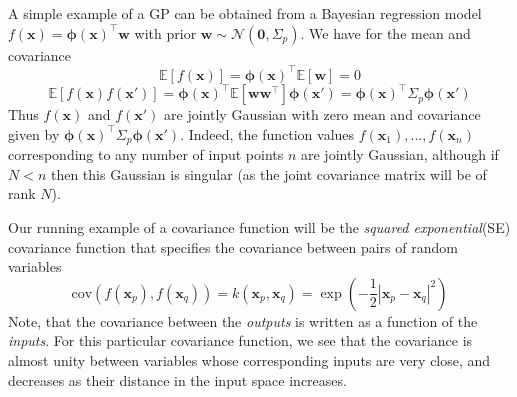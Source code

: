\documentclass[twoside]{article}
\begin{document}
A simple example of a GP can be obtained from a Bayesian regression model $f(\boldsymbol{x}) = \boldsymbol{\phi(x)}^\intercal\boldsymbol{w}$ with prior $\boldsymbol{w} \sim \mathcal{N}(\boldsymbol{0}, \Sigma_p)$. We have for the mean and covariance
\begin{equation*}
    \mathbb{E}[f(\boldsymbol{x})] = \boldsymbol{\phi(x)}^\intercal\mathbb{E}[\boldsymbol{w}] = 0
\end{equation*}
\begin{equation*}
    \mathbb{E}[f(\boldsymbol{x})f(\boldsymbol{x'})] = \boldsymbol{\phi(x)}^\intercal\mathbb{E}[\boldsymbol{ww^\intercal}]\boldsymbol{\phi(x')} = \boldsymbol{\phi(x)}^\intercal\Sigma_p\boldsymbol{\phi(x')}
\end{equation*}
Thus $f(\boldsymbol{x})$ and $f(\boldsymbol{x'})$ are jointly Gaussian with zero mean and covariance given by $\boldsymbol{\phi(x)}^\intercal\Sigma_p\boldsymbol{\phi(x')}$. Indeed, the function values $f(\boldsymbol{x}_1),...,f(\boldsymbol{x}_n)$ corresponding to any number of input points $n$ are jointly Gaussian, although if $N < n$ then this Gaussian is singular (as the joint covariance matrix will be of rank $N$).\medskip

Our running example of a covariance function will be the \textit{squared exponential}(SE) covariance function that specifies the covariance between pairs of random variables
\begin{equation}
    \text{cov}(f(\boldsymbol{x}_p), f(\boldsymbol{x}_q)) = k(\boldsymbol{x}_p, \boldsymbol{x}_q) = \exp{(-\frac{1}{2}|\boldsymbol{x}_p - \boldsymbol{x}_q|^2)}
\end{equation}
Note, that the covariance between the \textit{outputs} is written as a function of the \textit{inputs}. For this particular covariance function, we see that the covariance is almost unity between variables whose corresponding inputs are very close, and decreases as their distance in the input space increases.\medskip
\end{document}
